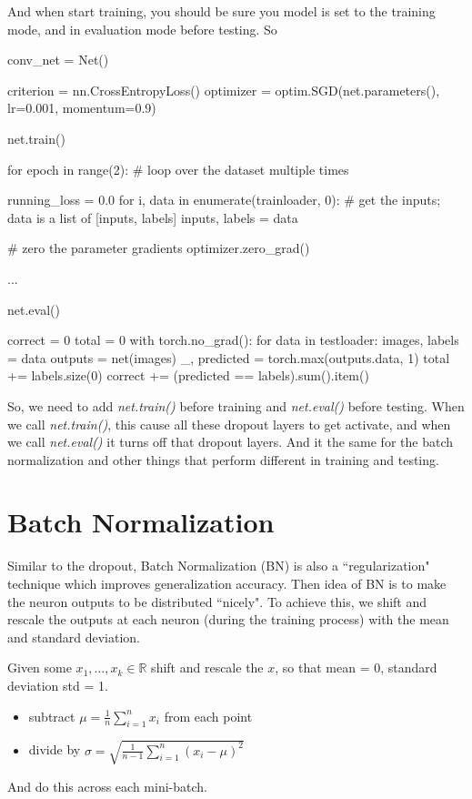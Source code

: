 And when start training, you should be sure you model is set to the training mode, and in evaluation mode before testing. So
\begin{python}
conv_net = Net()

criterion = nn.CrossEntropyLoss()
optimizer = optim.SGD(net.parameters(), lr=0.001, momentum=0.9)

net.train()

for epoch in range(2):  # loop over the dataset multiple times

    running_loss = 0.0
    for i, data in enumerate(trainloader, 0):
        # get the inputs; data is a list of [inputs, labels]
        inputs, labels = data

        # zero the parameter gradients
        optimizer.zero_grad()

...

net.eval()

correct = 0
total = 0
with torch.no_grad():
    for data in testloader:
        images, labels = data
        outputs = net(images)
        _, predicted = torch.max(outputs.data, 1)
        total += labels.size(0)
        correct += (predicted == labels).sum().item()

\end{python}
So, we need to add \emph{net.train()} before training and \emph{net.eval()} before testing. When we call \emph{net.train()}, this cause all these dropout layers to get activate, and when we call \emph{net.eval()} it turns off that dropout layers. And it the same for the batch normalization and other things that perform different in training and testing.


\section{Batch Normalization}
Similar to the dropout, Batch Normalization (BN) is also a ``regularization" technique which improves generalization accuracy. Then idea of BN is to make 
the neuron outputs to be distributed ``nicely".
To achieve this, we shift and rescale the outputs at each neuron (during the training process) with the mean and standard deviation.

Given some $x_1, \ldots, x_k\in\mathbb{R}$ shift and rescale the $x$, so that mean = 0, standard deviation std = 1. 
\begin{itemize}
\item subtract $\mu = \frac{1}{n}\sum_{i=1}^n x_i$ from each point
\item divide by $\sigma = \sqrt{\frac{1}{n-1}\sum_{i=1}^n (x_i-\mu)^2}$
\end{itemize}
And do this across each mini-batch.
 
